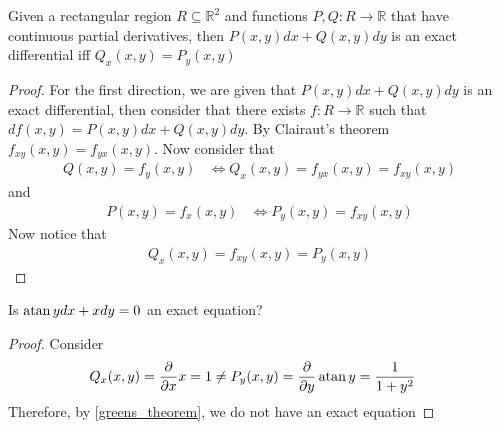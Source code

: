 \documentclass[notes]{subfiles}
\begin{document}
\begin{theorem} \label{greens_theorem}
    Given a rectangular region $R \subseteq \mathbb{R}^2$ and functions $P, Q\colon R \to \mathbb{R}$ that have continuous partial derivatives, then $P(x, y)dx + Q(x, y)dy$ is an exact differential iff $Q_x(x, y) = P_y(x, y)$
\end{theorem}
\begin{proof}
    For the first direction, we are given that $P(x, y)dx + Q(x, y)dy$ is an exact differential, then consider that there exists $f\colon R \to \mathbb{R}$ such that $df(x, y) = P(x, y)dx + Q(x, y)dy$. By Clairaut's theorem $f_{xy}(x, y) = f_{yx}(x, y)$. Now consider that
    \begin{align*}
        Q(x, y) = f_y(x, y)
        &\iff Q_x(x, y) = f_{yx}(x, y) = f_{xy}(x, y)
    \end{align*}
    and
    \begin{align*}
        P(x, y) = f_x(x, y)
        &\iff P_y(x, y) = f_{xy}(x, y)
    \end{align*}
    Now notice that
    \begin{align*}
        Q_x(x, y) = f_{xy}(x, y) = P_y(x, y)
    \end{align*}
\end{proof}

\begin{exercise}
    Is $\operatorname{atan} y dx + x dy = 0$ an exact equation?
\end{exercise}
\begin{proof}
    Consider
    \begin{align*}
        Q_x(x, y)
        &= \frac{\partial}{\partial x} x
        = 1
        \neq P_y(x, y)
        = \frac{\partial}{\partial y} \operatorname{atan} y
        = \frac{1}{1 + y^2}
    \end{align*}
    Therefore, by \cref{greens_theorem}, we do not have an exact equation
\end{proof}
\end{document}
